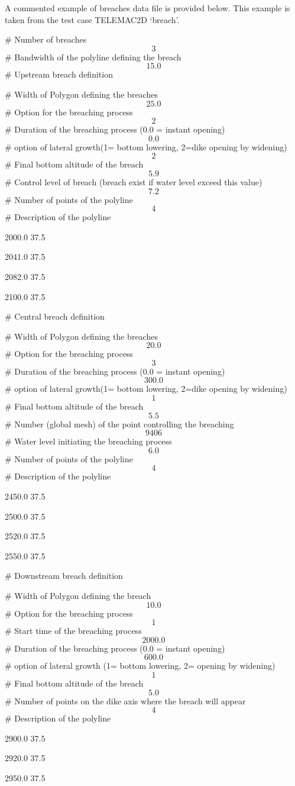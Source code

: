 \documentclass{article} %
\begin{document}
 A commented example of breaches data file is provided below. This example is taken from the test case TELEMAC2D `breach'.



 \# Number of breaches
\[3\]
\# Bandwidth of the polyline defining the breach
\[15.0\]
\# Upstream breach definition

 \# Width of Polygon defining the breaches
\[25.0\]
\# Option for the breaching process
\[2\]
\# Duration of the breaching process (0.0 = instant opening)
\[0.0\]
\# option of lateral growth(1= bottom lowering, 2=dike opening by widening)
\[2\]
\# Final bottom altitude of the breach
\[5.9\]
\# Control level of breach (breach exist if water level exceed this value)
\[7.2\]
\# Number of points of the polyline
\[4\]
\# Description of the polyline

 2000.0 37.5

 2041.0 37.5

 2082.0 37.5

 2100.0 37.5

 \# Central breach definition

 \# Width of Polygon defining the breaches
\[20.0\]
\# Option for the breaching process
\[3\]
\# Duration of the breaching process (0.0 = instant opening)
\[300.0\]
\# option of lateral growth(1= bottom lowering, 2=dike opening by widening)
\[1\]
\# Final bottom altitude of the breach
\[5.5\]
\# Number (global mesh) of the point controlling the breaching
\[9406\]
\# Water level initiating the breaching process
\[6.0\]
\# Number of points of the polyline
\[4\]
\# Description of the polyline

 2450.0 37.5

 2500.0 37.5

 2520.0 37.5

 2550.0 37.5

 \# Downstream breach definition

 \# Width of Polygon defining the breach
\[10.0\]
\# Option for the breaching process
\[1\]
\# Start time of the breaching process
\[2000.0\]
\# Duration of the breaching process (0.0 = instant opening)
\[600.0\]
\# option of lateral growth (1= bottom lowering, 2= opening by widening)
\[1\]
\# Final bottom altitude of the breach
\[5.0\]
\# Number of points on the dike axis where the breach will appear
\[4\]
\# Description of the polyline

 2900.0 37.5

 2920.0 37.5

 2950.0 37.5
\end{document}
